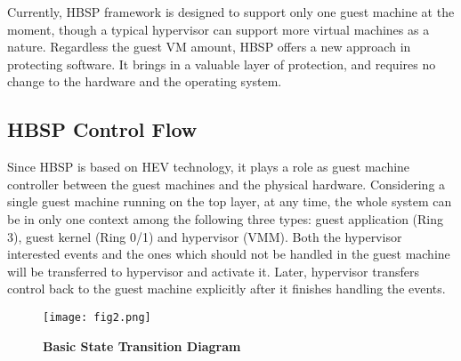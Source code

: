 \documentclass[conference]{IEEEtran}
\begin{document}

Currently, HBSP framework is designed to support only one guest
machine at the moment, though a typical hypervisor can support
more virtual machines as a nature. Regardless the guest VM amount,
HBSP offers a new approach in protecting software. It brings in a
valuable layer of protection, and requires no change to the
hardware and the operating system.

\subsection{HBSP Control Flow}
Since HBSP is based on HEV technology, it plays a role as guest
machine controller between the guest machines and the physical
hardware. Considering a single guest machine running on the top
layer, at any time, the whole system can be in only one context
among the following three types: guest application (Ring 3), guest
kernel (Ring 0/1) and hypervisor (VMM). Both the hypervisor
interested events and the ones which should not be handled in the
guest machine will be transferred to hypervisor and activate it.
Later, hypervisor transfers control back to the guest machine
explicitly after it finishes handling the events.

\begin{figure}[!htb]
\begin{center}
\texttt{[image: fig2.png]}
\end{center}
\caption{{\bf Basic State Transition Diagram}} \label{Figure 2.}
\end{figure}
\end{document}

